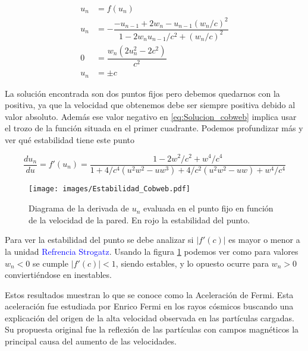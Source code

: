 \documentclass[11pt, spanish]{book}
\begin{document}
\begin{align}
    u_n &= f(u_n) \nonumber\\
    u_n &= -\dfrac{-u_{n-1} + 2w_n - u_{n-1}(w_n/c)^2}{1 - 2w_n u_{n-1}/c^2 + (w_n/c)^2}\label{eq:Solucion_cobweb} \\
    0 &= \dfrac{w_n\left( 2u_n^2-2c^2 \right)}{c^2} \nonumber\\
    u_n &= \pm c \label{eq:Solucion_cobweb,valor}
\end{align}

\vspace{3mm}

La solución encontrada son dos puntos fijos pero debemos quedarnos con la positiva, ya que la velocidad que obtenemos debe ser siempre positiva debido al valor absoluto. Además ese valor negativo en \ref{eq:Solucion_cobweb} implica usar el trozo de la función situada en el primer cuadrante. Podemos profundizar más y ver qué estabilidad tiene este punto

\begin{equation}
    \dfrac{du_n}{du} = f'(u_n) = \dfrac{1 - 2w^2/c^2 + w^4/c^4}{1 + 4/c^4\left( u^2w^2-uw^3 \right) + 4/c^2\left( u^2w^2-uw \right) + w^4/c^4}
\end{equation}

\begin{figure}[H]
    \centering
    \texttt{[image: images/Estabilidad\_Cobweb.pdf]}
    \caption{Diagrama de la derivada de $u_n$ evaluada en el punto fijo en función de la velocidad de la pared. En rojo la estabilidad del punto.}
    \label{fig:estabilidad_cobweb}
\end{figure}

\vspace{3mm}

Para ver la estabilidad del punto se debe analizar si \( \left| f'(c) \right| \) es mayor o menor a la unidad \cite{Strogatz} \textcolor{blue}{Refrencia Strogatz}. Usando la figura \ref{fig:estabilidad_cobweb} podemos ver como para valores \( w_n < 0 \) se cumple \( \left| f'(c) \right| < 1 \), siendo estables, y lo opuesto ocurre para \( w_n > 0 \) conviertiéndose en inestables.

\vspace{3mm}

\textcolor{green!70!black}{
Estos resultados muestran lo que se conoce como la Aceleración de Fermi. Esta aceleración fue estudiada por Enrico Fermi en los rayos cósmicos buscando una explicación del origen de la alta velocidad observada en las partículas cargadas. Su propuesta original fue la reflexión de las partículas con campos magnéticos la principal causa del aumento de las velocidades.} 
\end{document}
